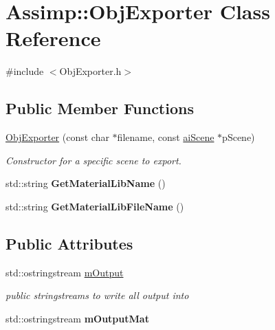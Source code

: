 \hypertarget{class_assimp_1_1_obj_exporter}{\section{Assimp\+:\+:Obj\+Exporter Class Reference}
\label{class_assimp_1_1_obj_exporter}
}


{\ttfamily \#include $<$Obj\+Exporter.\+h$>$}

\subsection*{Public Member Functions}
\begin{DoxyCompactItemize}
\item 
\hypertarget{class_assimp_1_1_obj_exporter_af2da1baa32e112390716037472a4ac74}{\hyperlink{class_assimp_1_1_obj_exporter_af2da1baa32e112390716037472a4ac74}{Obj\+Exporter} (const char $\ast$filename, const \hyperlink{structai_scene}{ai\+Scene} $\ast$p\+Scene)}\label{class_assimp_1_1_obj_exporter_af2da1baa32e112390716037472a4ac74}

\begin{DoxyCompactList}\small\item\em Constructor for a specific scene to export. \end{DoxyCompactList}\item 
\hypertarget{class_assimp_1_1_obj_exporter_a798e05eb1074295c5a68c43edfbc9c92}{std\+::string {\bfseries Get\+Material\+Lib\+Name} ()}\label{class_assimp_1_1_obj_exporter_a798e05eb1074295c5a68c43edfbc9c92}

\item 
\hypertarget{class_assimp_1_1_obj_exporter_a757ad062dcca00741715cb8f565d7d88}{std\+::string {\bfseries Get\+Material\+Lib\+File\+Name} ()}\label{class_assimp_1_1_obj_exporter_a757ad062dcca00741715cb8f565d7d88}

\end{DoxyCompactItemize}
\subsection*{Public Attributes}
\begin{DoxyCompactItemize}
\item 
\hypertarget{class_assimp_1_1_obj_exporter_a0b595005f0ab6116a1c1f861823f7cdf}{std\+::ostringstream \hyperlink{class_assimp_1_1_obj_exporter_a0b595005f0ab6116a1c1f861823f7cdf}{m\+Output}}\label{class_assimp_1_1_obj_exporter_a0b595005f0ab6116a1c1f861823f7cdf}

\begin{DoxyCompactList}\small\item\em public stringstreams to write all output into \end{DoxyCompactList}\item 
\hypertarget{class_assimp_1_1_obj_exporter_a5e3bb22c4b1cf64ca4acb23f3fad53c3}{std\+::ostringstream {\bfseries m\+Output\+Mat}}\label{class_assimp_1_1_obj_exporter_a5e3bb22c4b1cf64ca4acb23f3fad53c3}

\end{DoxyCompactItemize}


